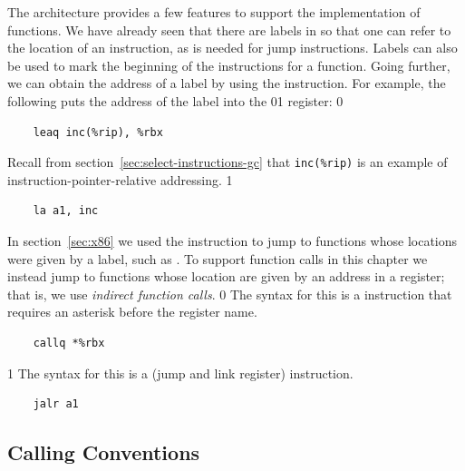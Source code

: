 \documentclass[7x10]{TimesAPriori_MIT}%
\def\xeightysixEd{0}
\def\riscvEd{1}
\def\architecture{1}
\newcommand\ifriscv[1]{\if\architecture\riscvEd{#1}\fi}
\newcommand\ifxeightsix[1]{\if\architecture\xeightysixEd{#1}\fi}
\numberwithin{theorem}{chapter}
\numberwithin{definition}{chapter}
\numberwithin{equation}{chapter}
\begin{document}


The \ArchName{} architecture provides a few features to support the
implementation of functions. We have already seen that there are
labels in \ArchName{} so that one can refer to the location of an instruction,
as is needed for jump instructions. Labels can also be used to mark
the beginning of the instructions for a function.  Going further, we
can obtain the address of a label by using the {\ILEA}
instruction. For example, the following puts the address of the
 label into the \ifxeightsix{}\ifriscv{} register:
\if\architecture\xeightysixEd
\begin{lstlisting}
    leaq inc(%rip), %rbx
\end{lstlisting}
Recall from section~\ref{sec:select-instructions-gc} that
\verb!inc(%rip)! is an example of instruction-pointer-relative
addressing.
\fi
\if\architecture\riscvEd
\begin{lstlisting}
    la a1, inc
\end{lstlisting}
\fi

In section~\ref{sec:x86} we used the {\ICALL} instruction to jump
to functions whose locations were given by a label, such as
. To support function calls in this chapter we instead
jump to functions whose location are given by an address in
a register; that is, we use \emph{indirect function calls}. 
\if\architecture\xeightysixEd
The {\ArchName} syntax for this is a {\ICALL} instruction that requires an asterisk
before the register name.
\begin{lstlisting}
    callq *%rbx
\end{lstlisting}
\fi
\if\architecture\riscvEd
The {\ArchName} syntax for this is a {} (jump and link register) instruction.
\begin{lstlisting}
    jalr a1
\end{lstlisting}
\fi

\subsection{Calling Conventions}
\label{sec:calling-conventions-fun}
\end{document}
